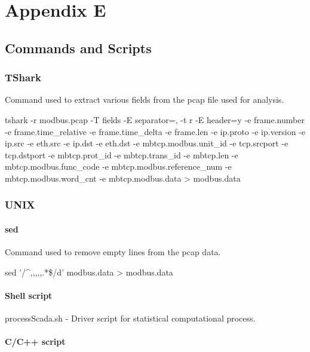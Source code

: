 \documentclass[12pt,]{article}
\begin{document}
\section*{Appendix E}\label{appendix-e}

\subsection*{Commands and Scripts}\label{commands-and-scripts}

\subsubsection{TShark}\label{tshark}

Command used to extract various fields from the pcap file used for
analysis.

tshark -r modbus.pcap -T fields -E separator=, -t r -E header=y -e
frame.number -e frame.time\_relative -e frame.time\_delta -e frame.len
-e ip.proto -e ip.version -e ip.src -e eth.src -e ip.dst -e eth.dst -e
mbtcp.modbus.unit\_id -e tcp.srcport -e tcp.dstport -e mbtcp.prot\_id -e
mbtcp.trans\_id -e mbtcp.len -e mbtcp.modbus.func\_code -e
mbtcp.modbus.reference\_num -e mbtcp.modbus.word\_cnt -e
mbtcp.modbus.data \textgreater{} modbus.data

\subsubsection{UNIX}\label{unix}

\paragraph{sed}\label{sed}

Command used to remove empty lines from the pcap data.

sed '/\^{},,,,,.*\$/d' modbus.data \textgreater{} modbus.data

\paragraph{Shell script}\label{shell-script}

processScada.sh - Driver script for statistical computational process.

\paragraph{C/C++ script}\label{cc-script}
\end{document}
